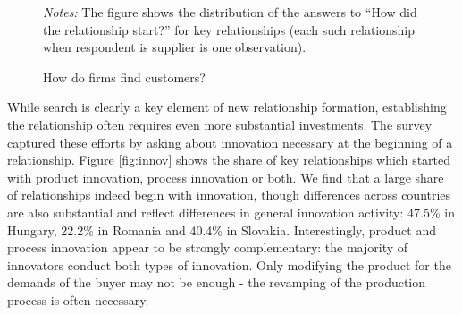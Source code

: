 \documentclass[final, dvipsnames, authoryear,12pt]{elsarticle}
\begin{document}
\begin{figure}[h]    
    \begin{center}
    \caption{How do firms find customers?}  
    \label{fig:rel_form}       
    \end{center}
    {\footnotesize \textit{Notes:} The figure shows the distribution of the answers to ``How did the relationship start?'' for key relationships (each such relationship when respondent is supplier is one observation). }     
\end{figure}

While search is clearly a key element of new relationship formation, establishing the relationship often requires even more substantial investments. The survey captured these efforts by asking about innovation necessary at the beginning of a relationship. Figure \ref{fig:innov} shows the share of key relationships which started with product innovation, process innovation or both. We find that a large share of relationships indeed begin with innovation, though differences across countries are also substantial and reflect differences in general innovation activity: 47.5\% in Hungary, 22.2\% in Romania and 40.4\% in Slovakia. Interestingly, product and process innovation appear to be strongly complementary: the majority of innovators conduct both types of innovation. Only modifying the product for the demands of the buyer may not be enough - the revamping of the production process is often necessary.
\end{document}
